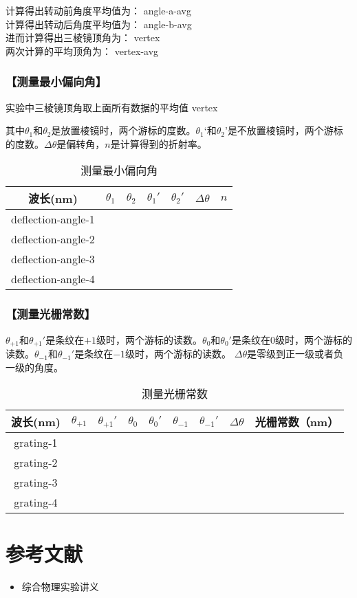 \documentclass{ctexart}
\let\oldsubsubsection\subsubsection
\renewcommand{\subsubsection}[1]{\oldsubsubsection{\!\!\!\!\!\!【#1】}}
\begin{document}
计算得出转动前角度平均值为：{{ angle-a-avg }} \\
计算得出转动后角度平均值为：{{ angle-b-avg }} \\
进而计算得出三棱镜顶角为：{{ vertex }} \\
两次计算的平均顶角为：{{ vertex-avg }}

\subsubsection{测量最小偏向角}

实验中三棱镜顶角取上面所有数据的平均值 {{ vertex }}

其中$\theta_1$和$\theta_2$是放置棱镜时，两个游标的度数。$\theta_1‘$和$\theta_2’$是不放置棱镜时，两个游标的度数。$\Delta \theta$是偏转角，$n$是计算得到的折射率。

\begin{table}[H]
  \centering
  \begin{tabular}{|c|c|c|c|c|c|c|}
    \hline
     波长(nm) & $\theta_1$ & $\theta_2$ & $\theta_1'$ & $\theta_2'$ & $\Delta \theta$ & $n$\\\hline
    {{ deflection-angle-1 }}\\\hline
    {{ deflection-angle-2 }}\\\hline
    {{ deflection-angle-3 }}\\\hline
    {{ deflection-angle-4 }}\\\hline
  \end{tabular}
  \caption{测量最小偏向角}
\end{table}


\subsubsection{测量光栅常数}

$\theta_{+1}$和$\theta_{+1}'$是条纹在$+1$级时，两个游标的读数。$\theta_0$和$\theta_0'$是条纹在$0$级时，两个游标的读数。$\theta_{-1}$和$\theta_{-1}'$是条纹在$-1$级时，两个游标的读数。
$\Delta \theta$是零级到正一级或者负一级的角度。

\begin{table}[H]
  \centering
  \begin{tabular}{|c|c|c|c|c|c|c|c|c|}
    \hline
     波长(nm) &  $\theta_{+1}$ & $\theta_{+1}'$ & $\theta_0$ & $\theta_0'$ & $\theta_{-1}$ & $\theta_{-1}'$ & $\Delta \theta$ & 光栅常数（nm）\\\hline
    {{ grating-1 }}\\\hline
    {{ grating-2 }}\\\hline
    {{ grating-3 }}\\\hline
    {{ grating-4 }}\\\hline
  \end{tabular}
  \caption{测量光栅常数}
\end{table}

\section{参考文献}
\begin{itemize}[leftmargin=0pt]
  \item[] 综合物理实验讲义
\end{itemize}
\end{document}
